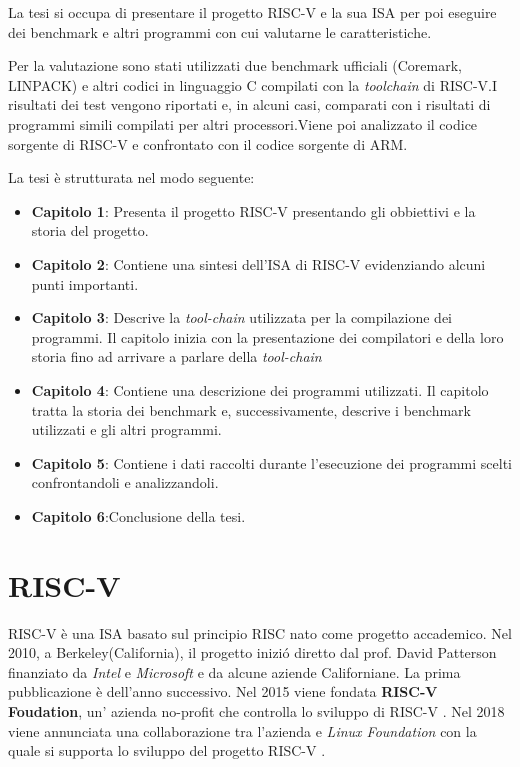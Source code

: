 \documentclass[12pt, a4paper]{report}
\begin{document}
La tesi si occupa di presentare il progetto RISC-V e la sua ISA per poi eseguire dei benchmark e altri programmi con cui valutarne le caratteristiche.

Per la valutazione sono stati utilizzati due benchmark ufficiali (Coremark, LINPACK) e altri
codici in linguaggio C compilati con la \textit{toolchain} di RISC-V.I risultati dei test vengono riportati e, in alcuni casi, comparati con i risultati di programmi simili compilati per altri processori.Viene poi analizzato il codice sorgente di RISC-V e confrontato con il codice sorgente di ARM.

La tesi è strutturata nel modo seguente:
\begin{itemize}
\item \textbf{Capitolo 1}: Presenta il progetto RISC-V presentando gli obbiettivi e la storia del progetto.
\item \textbf{Capitolo 2}: Contiene una sintesi dell'ISA di RISC-V evidenziando alcuni punti importanti.
\item \textbf{Capitolo 3}: Descrive la \textit{tool-chain} utilizzata per la compilazione dei programmi. Il capitolo inizia con la presentazione dei compilatori e della loro storia fino ad arrivare a parlare della \textit{tool-chain}
\item \textbf{Capitolo 4}: Contiene una descrizione dei programmi utilizzati. Il capitolo tratta la storia dei benchmark e, successivamente, descrive i benchmark utilizzati e gli altri programmi.
\item \textbf{Capitolo 5}: Contiene i dati raccolti durante l'esecuzione dei programmi scelti confrontandoli e analizzandoli.
\item \textbf{Capitolo 6}:Conclusione della tesi. 
\end{itemize}


\chapter{RISC-V}
RISC-V è una ISA basato sul principio RISC nato come progetto accademico. Nel 2010, a Berkeley(California), il progetto inizi\'o diretto dal prof. David Patterson finanziato da \textit{Intel } e \textit{Microsoft} e da alcune aziende Californiane. La prima pubblicazione è dell'anno successivo. Nel 2015 viene fondata \textbf{RISC-V Foudation}, un' azienda no-profit che controlla lo sviluppo di RISC-V \cite{RISCVHistory}. Nel 2018 viene annunciata una collaborazione tra l'azienda e \textit{Linux Foundation} con la quale si supporta lo sviluppo del progetto RISC-V \cite{RISCOrgHistory}.
\end{document}
